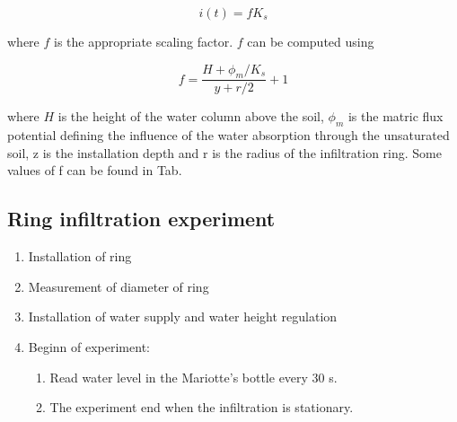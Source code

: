 \documentclass[
10pt, %
a4paper, %
oneside, %
headinclude,footinclude, %
BCOR5mm, %
]{scrartcl}
\begin{document}
\begin{equation}\label{eq_wu}
i(t)= f K_s
\end{equation}

where $f$ is the appropriate scaling factor. $f$ can be computed using 

\begin{equation}\label{eq_wuf}
f=\frac{H+\phi_m/K_s}{y+r/2}+1
\end{equation}

where $H$ is the height of the water column above the soil, $\phi_m$ is the matric flux potential defining the influence of the water absorption through the unsaturated soil, z is the installation depth and r is the radius of the infiltration ring. Some values of f can be found in Tab.

\begin{table}[!h]
	\centering
	\caption{\label{tab_heat}Values for the scaling factor f Eq. \ref{eq_wuf} \cite{wu1997generalized}. The values are for z=5cm,H=5cm and an initial pressure head of pF=3.}
\end{table}

\subsection{Ring infiltration experiment}

\begin{enumerate}
	\item Installation of ring 
	\item Measurement of diameter of ring
	\item Installation of water supply and water height regulation
	\item Beginn of experiment:
	\begin{enumerate}
		\item Read water level in the Mariotte's bottle every 30 s.
		\item The experiment end when the infiltration is stationary.
	\end{enumerate}
\end{enumerate}
\end{document}
